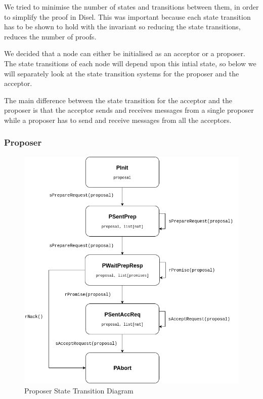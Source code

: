 We tried to minimise the number of states and transitions between them, in order
to simplify the proof in Disel. This was important because each state transition
has to be shown to hold with the invariant so reducing the state transitions,
reduces the number of proofs.

We decided that a node can either be initialised as an acceptor or a proposer.
The state transitions of each node will depend upon this intial state, so below
we will separately look at the state transition systems for the proposer and the
acceptor.

The main difference between the state transition for the acceptor and the proposer
is that the acceptor sends and receives messages from a single proposer while a
proposer has to send and receive messages from all the acceptors.


\subsubsection{Proposer}
\begin{figure}
\includegraphics[width=\textwidth]{figures/proposer_state_transitions.png}
\caption{Proposer State Transition Diagram
\label{fig:myInlineFigure}}
\end{figure}

